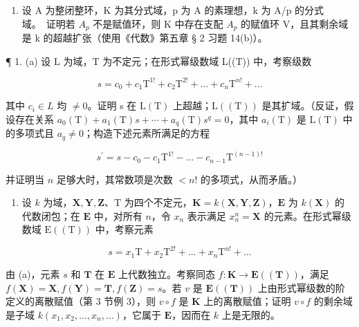 \begin{enumerate}
\def\labelenumi{\arabic{enumi}.}
\setcounter{enumi}{5}
\tightlist
\item
  设 A 为整闭整环，K 为其分式域，p 为 A 的素理想，k 为 A/p 的分式域。~证明若 \(A_{p}\) 不是赋值环，则 K 中存在支配 \(A_{p}\) 的赋值环 V，且其剩余域是 k 的超越扩张（使用《代数》第五章 § 2 习题 14(b)）。
\end{enumerate}


¶ 1. (a) 设 L 为域，T 为不定元；在形式幂级数域 L((T)) 中，考察级数

\[
s = c _ {0} + c _ {1} \mathrm{T} ^ {1!} + c _ {2} \mathrm{T} ^ {2!} + \dots + c _ {n} \mathrm{T} ^ {n!} + \dots
\]

其中 \(c_{i} \in L\) 均 \(\neq 0\)。证明 s 在 \(\mathrm{L}(\mathrm{T})\) 上超越；\(\mathrm{L}((\mathrm{T}))\) 是其扩域。（反证，假设存在关系 \(a_{0}(\mathrm{T}) + a_{1}(\mathrm{T})s + \cdots + a_{q}(\mathrm{T})s^{q} = 0\)，其中 \(a_{i}(\mathrm{T})\) 是 \(\mathrm{L}(\mathrm{T})\) 中的多项式且 \(a_{q} \neq 0\)；构造下述元素所满足的方程

\[
s ^ {\prime} = s - c _ {0} - c _ {1} \mathrm{T} ^ {1!} - \dots - c _ {n - 1} \mathrm{T} ^ {(n - 1)!}
\]

并证明当 \(n\) 足够大时，其常数项是次数 \(< n!\) 的多项式，从而矛盾。）

\begin{enumerate}
\def\labelenumi{(\alph{enumi})}
\setcounter{enumi}{1}
\tightlist
\item
  设 \(k\) 为域，\(\mathbf{X}, \mathbf{Y}, \mathbf{Z}\)、\(\mathrm{T}\) 为四个不定元，\(\mathbf{K} = k(\mathbf{X}, \mathbf{Y}, \mathbf{Z})\)，\(\mathbf{E}\) 为 \(k(\mathbf{X})\) 的代数闭包；在 \(\mathbf{E}\) 中，对所有 \(n\)，令 \(x_{n}\) 表示满足 \(x_{n}^{n} = \mathbf{X}\) 的元素。在形式幂级数域 \(\mathrm{E}((\mathrm{T}))\) 中，考察元素
\end{enumerate}

\[
s = x _ {1} \mathrm{T} + x _ {2} \mathrm{T} ^ {2!} + \dots + x _ {n} \mathrm{T} ^ {n!} + \dots
\]

由 (a)，元素 \(s\) 和 \(\mathbf{T}\) 在 \(\mathbf{E}\) 上代数独立。考察同态 \(f\colon \mathbf{K} \to \mathbf{E}((\mathbf{T}))\)，满足 \(f(\mathbf{X}) = \mathbf{X}, f(\mathbf{Y}) = \mathbf{T}, f(\mathbf{Z}) = s\)。若 \(v\) 是 \(\mathbf{E}((\mathbf{T}))\) 上由形式幂级数的阶定义的离散赋值（第 3 节例 3），则 \(v \circ f\) 是 \(\mathbf{K}\) 上的离散赋值；证明 \(v \circ f\) 的剩余域是子域 \(k(x_1, x_2, \ldots, x_n, \ldots)\)，它属于 \(\mathbf{E}\)，因而在 \(k\) 上是无限的。

